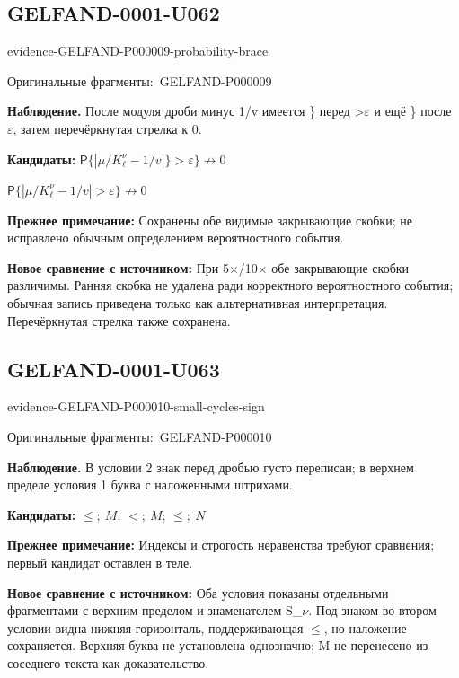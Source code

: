 \documentclass[11pt]{article}
\newcommand{\EvidenceBlock}[4]{%
 \par\smallskip\noindent\begin{minipage}{\linewidth}
 \begin{minipage}[t]{.47\linewidth}\vspace{0pt}\centering
 \csname evidence-#1-#2\endcsname\par
 {\scriptsize\SourceCropCaption\ #1}\par
 \end{minipage}\hfill
 \begin{minipage}[t]{.49\linewidth}\vspace{0pt}\raggedright
 {\small\color{orange!65!black}\textbf{#4} #3}\par
 \end{minipage}
 \end{minipage}\par\smallskip}
\newcommand{\SourceCropCaption}{Оригинальные фрагменты:}\newcommand{\ReadingCaption}{Сомнительное чтение.}\newcommand{\IncompleteCaption}{Неразобранный фрагмент.}\newcommand{\DiagramCaption}{Рисунок и набранное описание.}
\begin{document}
\subsection*{GELFAND-0001-U062}
\EvidenceBlock{GELFAND-P000009}{probability-brace}{После модуля дроби минус 1/v имеется \} перед >\(\varepsilon\) и ещё \} после \(\varepsilon\), затем перечёркнутая стрелка к 0.}{Наблюдение.}
\par\smallskip\noindent\textbf{Кандидаты: } \(\mathsf P\{|\mu/K_\ell^\nu-1/v|\}>\varepsilon\}\not\to0\)\par\smallskip\(\mathsf P\{|\mu/K_\ell^\nu-1/v|>\varepsilon\}\not\to0\)\par
\par\smallskip\noindent\textbf{Прежнее примечание: } Сохранены обе видимые закрывающие скобки; не исправлено обычным определением вероятностного события.\par
\par\smallskip\noindent\textbf{Новое сравнение с источником: } При 5×/10× обе закрывающие скобки различимы. Ранняя скобка не удалена ради корректного вероятностного события; обычная запись приведена только как альтернативная интерпретация. Перечёркнутая стрелка также сохранена.\par

\subsection*{GELFAND-0001-U063}
\EvidenceBlock{GELFAND-P000010}{small-cycles-sign}{В условии 2 знак перед дробью густо переписан; в верхнем пределе условия 1 буква с наложенными штрихами.}{Наблюдение.}
\par\smallskip\noindent\textbf{Кандидаты: } \(\le;\ M\); \(<;\ M\); \(\le;\ N\)\par
\par\smallskip\noindent\textbf{Прежнее примечание: } Индексы и строгость неравенства требуют сравнения; первый кандидат оставлен в теле.\par
\par\smallskip\noindent\textbf{Новое сравнение с источником: } Оба условия показаны отдельными фрагментами с верхним пределом и знаменателем S\_\(\nu\). Под знаком во втором условии видна нижняя горизонталь, поддерживающая \(\le\), но наложение сохраняется. Верхняя буква не установлена однозначно; M не перенесено из соседнего текста как доказательство.\par
\end{document}

